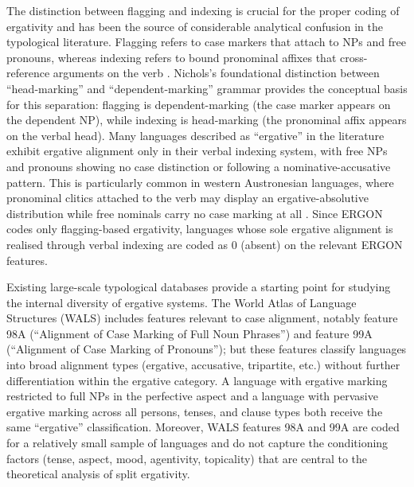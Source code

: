 \documentclass[12pt,a4paper]{article}
\begin{document}
The distinction between flagging and indexing is crucial for the proper coding of ergativity and has been the source of considerable analytical confusion in the typological literature. Flagging refers to case markers that attach to NPs and free pronouns, whereas indexing refers to bound pronominal affixes that cross-reference arguments on the verb \cite{haspelmath2013,nichols1986}. Nichols's \cite{nichols1986} foundational distinction between ``head-marking'' and ``dependent-marking'' grammar provides the conceptual basis for this separation: flagging is dependent-marking (the case marker appears on the dependent NP), while indexing is head-marking (the pronominal affix appears on the verbal head). Many languages described as ``ergative'' in the literature exhibit ergative alignment only in their verbal indexing system, with free NPs and pronouns showing no case distinction or following a nominative-accusative pattern. This is particularly common in western Austronesian languages, where pronominal clitics attached to the verb may display an ergative-absolutive distribution while free nominals carry no case marking at all \cite{liao2004,aldridge2004}. Since ERGON codes only flagging-based ergativity, languages whose sole ergative alignment is realised through verbal indexing are coded as 0 (absent) on the relevant ERGON features.

Existing large-scale typological databases provide a starting point for studying the internal diversity of ergative systems. The World Atlas of Language Structures (WALS) \cite{dryer2013} includes features relevant to case alignment, notably feature 98A (``Alignment of Case Marking of Full Noun Phrases'') and feature 99A (``Alignment of Case Marking of Pronouns''); but these features classify languages into broad alignment types (ergative, accusative, tripartite, etc.) without further differentiation within the ergative category. A language with ergative marking restricted to full NPs in the perfective aspect and a language with pervasive ergative marking across all persons, tenses, and clause types both receive the same ``ergative'' classification. Moreover, WALS features 98A and 99A are coded for a relatively small sample of languages and do not capture the conditioning factors (tense, aspect, mood, agentivity, topicality) that are central to the theoretical analysis of split ergativity.
\end{document}
